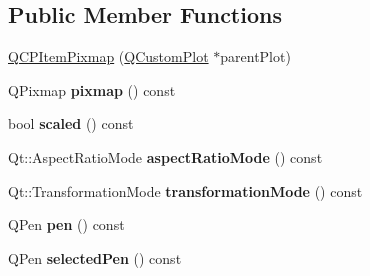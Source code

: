 \subsection*{Public Member Functions}
\begin{DoxyCompactItemize}
\item 
\hyperlink{class_q_c_p_item_pixmap_aa6de42a37261b21a5480e7da122345c3}{Q\+C\+P\+Item\+Pixmap} (\hyperlink{class_q_custom_plot}{Q\+Custom\+Plot} $\ast$parent\+Plot)
\item 
Q\+Pixmap {\bfseries pixmap} () const \hypertarget{class_q_c_p_item_pixmap_a73dea89e0eb45127a2705e2c7991b8d8}{}\label{class_q_c_p_item_pixmap_a73dea89e0eb45127a2705e2c7991b8d8}

\item 
bool {\bfseries scaled} () const \hypertarget{class_q_c_p_item_pixmap_a54026b89dff3c60376c2360f01b6fb83}{}\label{class_q_c_p_item_pixmap_a54026b89dff3c60376c2360f01b6fb83}

\item 
Qt\+::\+Aspect\+Ratio\+Mode {\bfseries aspect\+Ratio\+Mode} () const \hypertarget{class_q_c_p_item_pixmap_ac5b95c097169e107a61eebbb7c77523c}{}\label{class_q_c_p_item_pixmap_ac5b95c097169e107a61eebbb7c77523c}

\item 
Qt\+::\+Transformation\+Mode {\bfseries transformation\+Mode} () const \hypertarget{class_q_c_p_item_pixmap_a1d4751a7b9588354fc8e726d891153f7}{}\label{class_q_c_p_item_pixmap_a1d4751a7b9588354fc8e726d891153f7}

\item 
Q\+Pen {\bfseries pen} () const \hypertarget{class_q_c_p_item_pixmap_ab2b821c80cfade589472e933b9c4361f}{}\label{class_q_c_p_item_pixmap_ab2b821c80cfade589472e933b9c4361f}

\item 
Q\+Pen {\bfseries selected\+Pen} () const \hypertarget{class_q_c_p_item_pixmap_af8e839d7c7b84e214608feda3caec2bc}{}\label{class_q_c_p_item_pixmap_af8e839d7c7b84e214608feda3caec2bc}


\end{DoxyCompactItemize}
